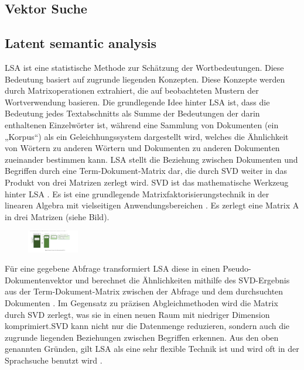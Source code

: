 
\subsection{Vektor Suche}

\subsection{Latent semantic analysis}
\ac{LSA} ist eine statistische Methode zur Schätzung der Wortbedeutungen. Diese Bedeutung basiert auf zugrunde liegenden Konzepten. Diese Konzepte werden durch Matrixoperationen extrahiert, die auf beobachteten Mustern der Wortverwendung basieren.
Die grundlegende Idee hinter LSA ist, dass die Bedeutung jedes Textabschnitts als Summe der Bedeutungen der darin enthaltenen Einzelwörter ist, 
während eine Sammlung von Dokumenten (ein „Korpus“) als ein Geleichhungssystem dargestellt wird, welches die Ähnlichkeit von Wörtern zu anderen Wörtern und Dokumenten zu anderen Dokumenten zueinander bestimmen kann.
LSA stellt die Beziehung zwischen Dokumenten und Begriffen durch eine Term-Dokument-Matrix dar, die durch \ac{SVD} weiter in das Produkt von drei Matrizen zerlegt wird. SVD ist das mathematische Werkzeug hinter LSA \cite{TheUseofLatentSemanticAnalysis}. Es ist eine grundlegende 
Matrixfaktorisierungstechnik in der linearen Algebra mit vielseitigen Anwendungsbereichen \cite{Paige1981Towards}. Es zerlegt eine Matrix A in drei Matrizen (siehe Bild).
\begin{figure}[h]
    \centering
    \includegraphics[width=0.2\textwidth]{../images/SVD.png}
    \label{fig:SVD}
\end{figure}
Für eine gegebene Abfrage transformiert LSA diese in einen Pseudo-Dokumentenvektor und berechnet die Ähnlichkeiten mithilfe des SVD-Ergebnis aus der Term-Dokument-Matrix zwischen der Abfrage und dem durchsuchten Dokumenten \cite{SystematicReviewofSemanticAnalysisMethods_2023} .
Im Gegensatz zu präzisen Abgleichmethoden wird die Matrix durch SVD zerlegt, was sie in einen neuen Raum mit niedriger Dimension komprimiert.SVD kann nicht nur die Datenmenge reduzieren, sondern auch die zugrunde liegenden Beziehungen zwischen Begriffen erkennen. 
Aus den oben genannten Gründen, gilt LSA als eine sehr flexible Technik ist und wird oft in der Sprachsuche benutzt wird \cite{TextMiningUsingLatentSemanticAnalysis} .

